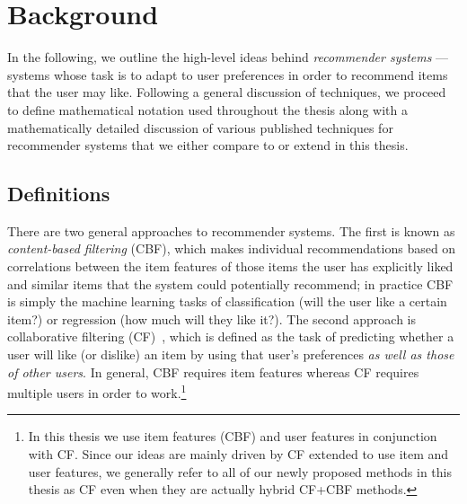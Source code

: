 
\chapter{Background}
\label{cha:background}

In the following, we outline the high-level ideas behind
\emph{recommender systems} --- systems whose task is to adapt to user
preferences in order to recommend items that the user may like.
Following a general discussion of techniques, we proceed to define
mathematical notation used throughout the thesis along with a 
mathematically detailed discussion of various published techniques for
recommender systems that we either compare to or extend in this thesis.

\section{Definitions}


There are two general approaches to recommender systems.  The first is
known as \emph{content-based filtering} (CBF), which makes individual
recommendations based on correlations between the item features of
those items the user has explicitly liked and similar items that the
system could potentially recommend; in practice CBF is simply the
machine learning tasks of classification (will the user like a certain
item?) or regression (how much will they like it?).  The second
approach is collaborative filtering (CF)~\cite{collab_filtering},
which is defined as the task of predicting whether a user will like
(or dislike) an item by using that user's preferences \emph{as well as
those of other users}.  In general, CBF requires item features whereas
CF requires multiple users in order to work.\footnote{In this thesis
we use item features (CBF) and user features in conjunction with CF.
Since our ideas are mainly driven by CF extended to use item and user
features, we generally refer to all of our newly proposed methods in
this thesis as CF even when they are actually hybrid CF+CBF methods.}

